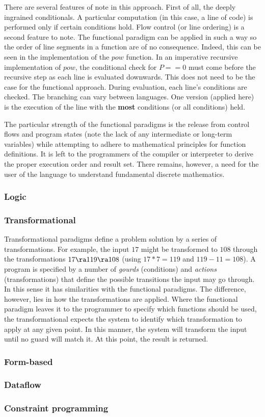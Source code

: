 There are several features of note in this approach. First of all, the deeply ingrained conditionals. A particular computation (in this case, a line of code) is performed only if certain conditions hold. Flow control (or line ordering) is a second feature to note. The functional paradigm can be applied in such a way so the order of line segments in a function are of no consequence. Indeed, this can be seen in the implementation of the $pow$ function. In an imperative recursive implementation of $pow$, the conditional check for $P==0$ must come before the recursive step as each line is evaluated downwards. This does not need to be the case for the functional approach. During evaluation, each line's conditions are checked. The branching can vary between languages. One version (applied here) is the execution of the line with the \textbf{most} conditions (or all conditions) held.

The particular strength of the functional paradigms is the release from control flows and program states (note the lack of any intermediate or long-term variables) while attempting to adhere to mathematical principles for function definitions. It is left to the programmers of the compiler or interpreter to derive the proper execution order and result set. There remains, however, a need for the user of the language to understand fundamental discrete mathematics.

\subsubsection*{Logic}


\subsubsection*{Transformational}
Transformational paradigms define a problem solution by a series of transformations. For example, the input $17$ might be transformed to $108$ through the transformations $17 \ra 119 \ra 108$ (using $17 * 7 = 119$ and $119 - 11 = 108$). A program is specified by a number of \emph{gourds} (conditions) and \emph{actions} (transformations) that define the possible transitions the input may go through. In this sense it has similarities with the functional paradigms. The difference, however, lies in how the transformations are applied. Where the functional paradigm leaves it to the programmer to specify which functions should be used, the transformational expects the system to identify which transformation to apply at any given point. In this manner, the system will transform the input until no guard will match it. At this point, the result is returned.

\subsubsection*{Form-based}


\subsubsection*{Dataflow}


\subsubsection*{Constraint programming}
